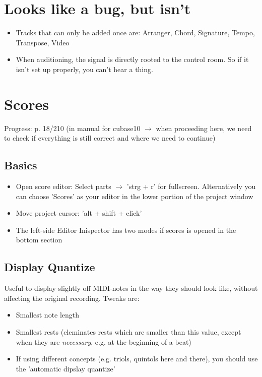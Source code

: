 \documentclass[10pt]{article}
\begin{document}
\section{Looks like a bug, but isn't}

\begin{itemize}
	\item Tracks that can only be added once are: Arranger, Chord, Signature, Tempo, Transpose, Video
	\item When auditioning, the signal is directly rooted to the control room. So if it isn't set up properly, you can't hear a thing.
\end{itemize}

\section{Scores}\label{Scores}

Progress: p. 18/210 (in manual for cubase10 $\rightarrow$ when proceeding here, we need to check if everything is still correct and where we need to continue)

\subsection{Basics}

\begin{itemize}
	\item Open score editor: Select parts $\rightarrow$ 'strg + r' for fullscreen. Alternatively you can choose 'Scores' as your editor in the lower portion of the project window
	\item Move project cursor: 'alt + shift + click'
	\item The left-side Editor Inispector has two modes if scores is opened in the bottom section
\end{itemize}

\subsection{Display Quantize}

Useful to display slightly off MIDI-notes in the way they should look like, without affecting the original recording. Tweaks are:

\begin{itemize}
	\item Smallest note length
	\item Smallest rests (eleminates rests which are smaller than this value, except when they are \textit{necessary}, e.g. at the beginning of a beat)
	\item If using different concepts (e.g. triols, quintols here and there), you should use the 'automatic dipslay quantize'
\end{itemize}
\end{document}
